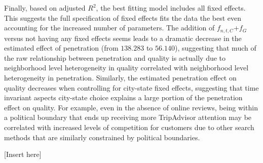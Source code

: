 \documentclass{informs_mod} %
\begin{document}
Finally, based on adjusted $R^2$, the best fitting model includes all fixed effects. This suggests the full specification of fixed effects fits the data the best even accounting for the increased number of parameters. The addition of $f_{n,t,C}$+$f_{G}$ versus not having any fixed effects seems leads to a dramatic decrease in the estimated effect of penetration (from $138.283$ to $56.140$), suggesting that much of the raw relationship between penetration and quality is actually due to neighborhood level heterogeneity in quality correlated with neighborhood level heterogeneity in penetration. Similarly, the estimated penetration effect on quality decreases when controlling for city-state fixed effects, suggesting that time invariant aspects city-state choice explains a large portion of the penetration effect on quality. For example, even in the absence of online reviews, being within a political boundary that ends up receiving more TripAdvisor attention may be correlated with increased levels of competition for customers due to other search methods that are similarly constrained by political boundaries. %

[Insert  here]

\end{document}
